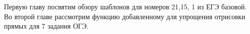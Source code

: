 
Первую главу посвятим обзору шаблонов для номеров 21,15, 1 из ЕГЭ базовой.
Во второй главе рассмотрим функцию добавленному для упрощения отрисовки прямых для 7 задания ОГЭ.
